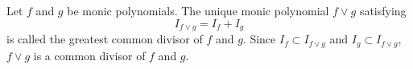 Let $f$ and $g$ be monic polynomials. The unique monic polynomial $f \vee g$ satisfying
$$I_{f \vee g} = I_f + I_g$$
is called the greatest common divisor of $f$ and $g$. Since $I_f \subset I_{f \vee g}$ and $I_g \subset I_{f \vee g}$, $f \vee g$ is a common divisor of $f$ and $g$.
